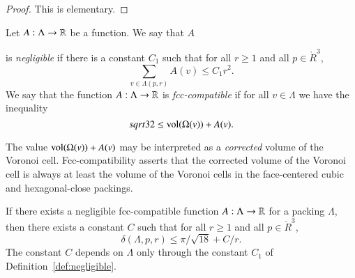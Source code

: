\begin{proof}  This is elementary.
\end{proof}

\begin{definition}[negligible]\label{def:negligible}
Let $A:\Lambda\to{\mathbb R}$ be a function.  We say that $A$

is
  {\it negligible\/}
if there is a constant $C_1$ such that for all $r\ge1$ and all
$p\in\ring{R}^3$,
   $$\sum_{v\in\Lambda(p,r)} A(v) \le C_1 r^2.$$
We say that the function $A:\Lambda\to{\mathbb R}$ is
  {\it fcc-compatible\/}
if for all $v\in\Lambda$ we have the inequality
$$sqrt{32}\le {\operatorname{vol}}(\Omega(v)) + A(v).$$
\end{definition}





\begin{remark}
The value ${\operatorname{vol}}(\Omega(v)) + A(v)$ may be interpreted as a
{\it corrected\/} volume of the Voronoi
cell. Fcc-compatibility asserts that the corrected volume of the
Voronoi cell is always at least the volume of the Voronoi cells in
the face-centered cubic and hexagonal-close packings.
\end{remark}



\begin{lemma}
\label{lemma:deltabound} If there exists a 
negligible  fcc-compatible function
$A:\Lambda\to{\mathbb R}$ for a 
packing $\Lambda$, then there
exists a constant $C$ such that for all $r\ge1$ and all
$p\in\ring{R}^3$,
    $$
    \delta(\Lambda,p,r)
    \le \pi/\sqrt{18} + C/r.
    $$
The constant $C$ depends on $\Lambda$ only through the constant
$C_1$ of Definition~\ref{def:negligible}.
\end{lemma}



